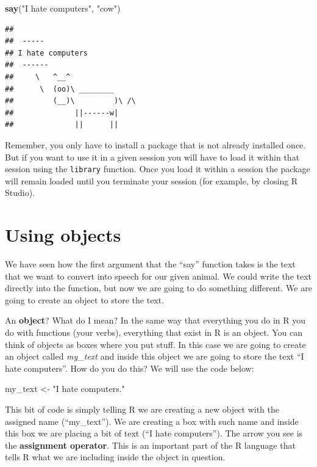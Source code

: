 \documentclass[]{book}
\newenvironment{Shaded}{\begin{snugshade}}{\end{snugshade}}
\newcommand{\KeywordTok}[1]{\textcolor[rgb]{0.13,0.29,0.53}{\textbf{#1}}}
\newcommand{\NormalTok}[1]{#1}
\newcommand{\StringTok}[1]{\textcolor[rgb]{0.31,0.60,0.02}{#1}}
\begin{document}
\begin{Shaded}
\begin{Highlighting}[]
\KeywordTok{say}\NormalTok{(}\StringTok{"I hate computers"}\NormalTok{, }\StringTok{"cow"}\NormalTok{)}
\end{Highlighting}
\end{Shaded}

\begin{verbatim}
## 
##  ----- 
## I hate computers 
##  ------ 
##     \   ^__^ 
##      \  (oo)\ ________ 
##         (__)\         )\ /\ 
##              ||------w|
##              ||      ||
\end{verbatim}

Remember, you only have to install a package that is not already installed once. But if you want to use it in a given session you will have to load it within that session using the \texttt{library} function. Once you load it within a session the package will remain loaded until you terminate your session (for example, by closing R Studio).

\hypertarget{using-objects}{%
\section{Using objects}\label{using-objects}}

We have seen how the first argument that the ``say'' function takes is the text that we want to convert into speech for our given animal. We could write the text directly into the function, but now we are going to do something different. We are going to create an object to store the text.

An \textbf{object}? What do I mean? In the same way that everything you do in R you do with functions (your verbs), everything that exist in R is an object. You can think of objects as boxes where you put stuff. In this case we are going to create an object called \emph{my\_text} and inside this object we are going to store the text ``I hate computers''. How do you do this? We will use the code below:

\begin{Shaded}
\begin{Highlighting}[]
\NormalTok{my_text <-}\StringTok{ "I hate computers."}
\end{Highlighting}
\end{Shaded}

This bit of code is simply telling R we are creating a new object with the assigned name (``my\_text''). We are creating a box with such name and inside this box we are placing a bit of text (``I hate computers''). The arrow you see is the \textbf{assignment operator}. This is an important part of the R language that tells R what we are including inside the object in question.
\end{document}

